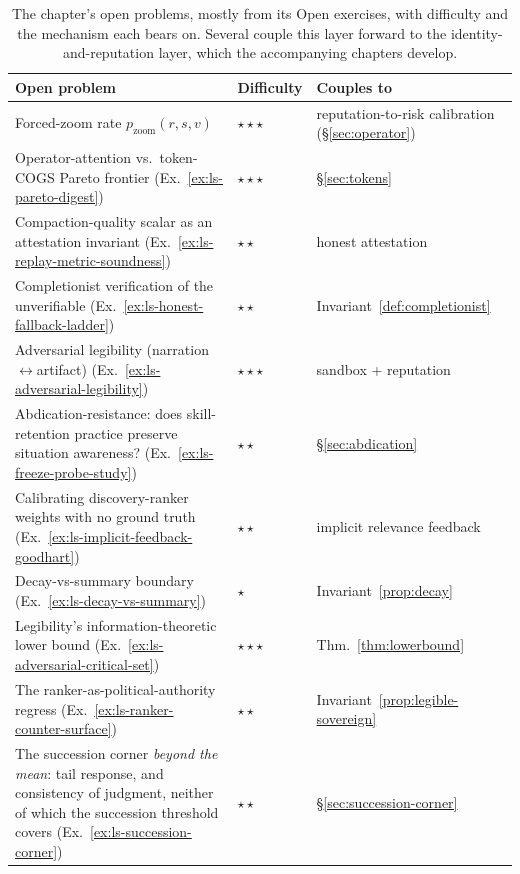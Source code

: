 \documentclass[11pt,a4paper]{article}
\theoremstyle{definition}
\theoremstyle{plain}
\begin{document}
\begin{table}[H]
\centering
\small
\renewcommand{\arraystretch}{1.2}
\begin{tabular}{@{}>{\raggedright\arraybackslash}p{}>{\raggedright\arraybackslash}p{}>{\raggedright\arraybackslash}p{}@{}}
\toprule
\textbf{Open problem} & \textbf{Difficulty} & \textbf{Couples to} \\
\midrule
Forced-zoom rate $p_{\mathrm{zoom}}(r,s,v)$ & $\star\star\star$ & reputation-to-risk calibration (\S\ref{sec:operator}) \\
Operator-attention vs.\ token-COGS Pareto frontier (Ex.~\ref{ex:ls-pareto-digest}) & $\star\star\star$ & \S\ref{sec:tokens} \\
Compaction-quality scalar as an attestation invariant (Ex.~\ref{ex:ls-replay-metric-soundness}) & $\star\star$ & honest attestation \\
Completionist verification of the unverifiable (Ex.~\ref{ex:ls-honest-fallback-ladder}) & $\star\star$ & Invariant~\ref{def:completionist} \\
Adversarial legibility (narration$\leftrightarrow$artifact) (Ex.~\ref{ex:ls-adversarial-legibility}) & $\star\star\star$ & sandbox + reputation \\
Abdication-resistance: does skill-retention practice preserve situation awareness? (Ex.~\ref{ex:ls-freeze-probe-study}) & $\star\star$ & \S\ref{sec:abdication} \\
Calibrating discovery-ranker weights with no ground truth (Ex.~\ref{ex:ls-implicit-feedback-goodhart}) & $\star\star$ & implicit relevance feedback \\
Decay-vs-summary boundary (Ex.~\ref{ex:ls-decay-vs-summary}) & $\star$ & Invariant~\ref{prop:decay} \\
Legibility's information-theoretic lower bound (Ex.~\ref{ex:ls-adversarial-critical-set}) & $\star\star\star$ & Thm.~\ref{thm:lowerbound} \\
The ranker-as-political-authority regress (Ex.~\ref{ex:ls-ranker-counter-surface}) & $\star\star$ & Invariant~\ref{prop:legible-sovereign} \\
The succession corner \emph{beyond the mean}: tail response, and consistency of
judgment, neither of which the succession threshold covers
(Ex.~\ref{ex:ls-succession-corner}) & $\star\star$ & \S\ref{sec:succession-corner} \\
\bottomrule
\end{tabular}
\caption{The chapter's open problems, mostly from its Open exercises, with
difficulty and the mechanism each bears on. Several couple this layer forward to the
identity-and-reputation layer, which the accompanying chapters develop.}
\label{tab:open}
\end{table}
\end{document}

